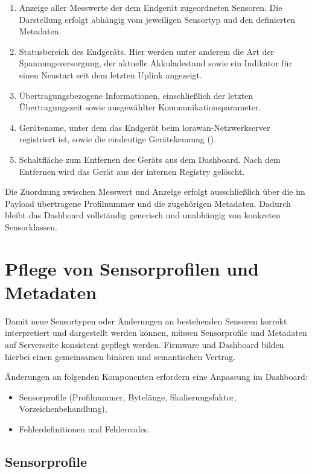 	\begin{enumerate}
		\item Anzeige aller Messwerte der dem Endgerät zugeordneten Sensoren. Die Darstellung erfolgt abhängig vom jeweiligen Sensortyp und den definierten Metadaten.
		\item Statusbereich des Endgeräts. Hier werden unter anderem die Art der Spannungsversorgung, der aktuelle Akkuladestand sowie ein Indikator für einen Neustart seit dem letzten Uplink angezeigt.
		\item Übertragungsbezogene Informationen, einschlie{\ss}lich der letzten Übertragungszeit sowie ausgewählter Kommunikationsparameter.
		\item Gerätename, unter dem das Endgerät beim \acs{lorawan}-Netzwerkserver registriert ist, sowie die eindeutige Gerätekennung ().
		\item Schaltfläche zum Entfernen des Geräts aus dem Dashboard. Nach dem Entfernen wird das Gerät aus der internen Registry gelöscht.
	\end{enumerate}
	
	Die Zuordnung zwischen Messwert und Anzeige erfolgt ausschlie{\ss}lich über die im Payload übertragene Profilnummer und die zugehörigen Metadaten. Dadurch bleibt das Dashboard vollständig generisch und unabhängig von konkreten Sensorklassen.

\section{Pflege von Sensorprofilen und Metadaten}
\label{Dashboard:ProfilesAndMetadata}

	Damit neue Sensortypen oder Änderungen an bestehenden Sensoren korrekt interpretiert und dargestellt werden können, müssen Sensorprofile und Metadaten auf Serverseite konsistent gepflegt werden. Firmware und Dashboard bilden hierbei einen gemeinsamen binären und semantischen Vertrag.
	
	Änderungen an folgenden Komponenten erfordern eine Anpassung im Dashboard:
	\begin{itemize}
		\item Sensorprofile (Profilnummer, Bytelänge, Skalierungsfaktor, Vorzeichenbehandlung),
		\item Fehlerdefinitionen und Fehlercodes.
	\end{itemize}

\subsection{Sensorprofile}

